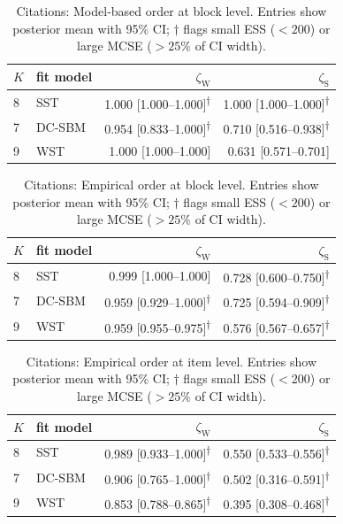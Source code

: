 \begin{table}[htpb]
\centering
\caption{Citations: Model-based order at block level. Entries show posterior mean with 95\% CI; $\dagger$ flags small ESS ($<200$) or large MCSE ($>25\%$ of CI width).}
\label{tab:citations_data-model-block}
\begin{tabular}[t]{l l r r}
\toprule
$K$ & fit model & $\zeta_{\mathrm{W}}$ & $\zeta_{\mathrm{S}}$ \\
\midrule
8 & SST & 1.000 [1.000--1.000]\textsuperscript{$\dagger$} & 1.000 [1.000--1.000]\textsuperscript{$\dagger$} \\
7 & DC-SBM & 0.954 [0.833--1.000]\textsuperscript{$\dagger$} & 0.710 [0.516--0.938]\textsuperscript{$\dagger$} \\
9 & WST & 1.000 [1.000--1.000] & 0.631 [0.571--0.701] \\
\bottomrule
\end{tabular}
\end{table}


\begin{table}[htpb]
\centering
\caption{Citations: Empirical order at block level. Entries show posterior mean with 95\% CI; $\dagger$ flags small ESS ($<200$) or large MCSE ($>25\%$ of CI width).}
\label{tab:citations_data-emp-block}
\begin{tabular}[t]{l l r r}
\toprule
$K$ & fit model & $\zeta_{\mathrm{W}}$ & $\zeta_{\mathrm{S}}$ \\
\midrule
8 & SST & 0.999 [1.000--1.000] & 0.728 [0.600--0.750]\textsuperscript{$\dagger$} \\
7 & DC-SBM & 0.959 [0.929--1.000]\textsuperscript{$\dagger$} & 0.725 [0.594--0.909]\textsuperscript{$\dagger$} \\
9 & WST & 0.959 [0.955--0.975]\textsuperscript{$\dagger$} & 0.576 [0.567--0.657]\textsuperscript{$\dagger$} \\
\bottomrule
\end{tabular}
\end{table}


\begin{table}[htpb]
\centering
\caption{Citations: Empirical order at item level. Entries show posterior mean with 95\% CI; $\dagger$ flags small ESS ($<200$) or large MCSE ($>25\%$ of CI width).}
\label{tab:citations_data-emp-item}
\begin{tabular}[t]{l l r r}
\toprule
$K$ & fit model & $\zeta_{\mathrm{W}}$ & $\zeta_{\mathrm{S}}$ \\
\midrule
8 & SST & 0.989 [0.933--1.000]\textsuperscript{$\dagger$} & 0.550 [0.533--0.556]\textsuperscript{$\dagger$} \\
7 & DC-SBM & 0.906 [0.765--1.000]\textsuperscript{$\dagger$} & 0.502 [0.316--0.591]\textsuperscript{$\dagger$} \\
9 & WST & 0.853 [0.788--0.865]\textsuperscript{$\dagger$} & 0.395 [0.308--0.468]\textsuperscript{$\dagger$} \\
\bottomrule
\end{tabular}
\end{table}



